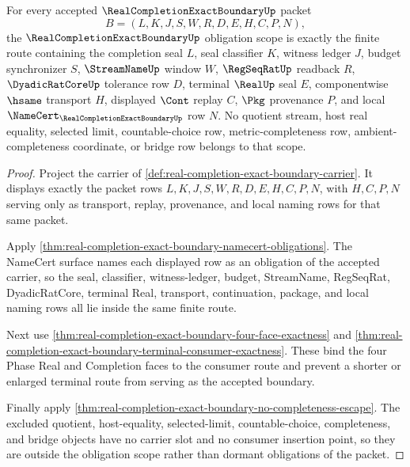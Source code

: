 \begin{theorem}
\label{thm:real-completion-exact-boundary-obligation-scope}
For every accepted $\RealCompletionExactBoundaryUp$ packet
$$
B=(L,K,J,S,W,R,D,E,H,C,P,N),
$$
the $\RealCompletionExactBoundaryUp$ obligation scope is exactly the finite route containing the completion seal $L$, seal classifier $K$, witness ledger $J$, budget synchronizer $S$, $\StreamNameUp$ window $W$, $\RegSeqRatUp$ readback $R$, $\DyadicRatCoreUp$ tolerance row $D$, terminal $\RealUp$ seal $E$, componentwise $\hsame$ transport $H$, displayed $\Cont$ replay $C$, $\Pkg$ provenance $P$, and local $\NameCert_{\RealCompletionExactBoundaryUp}$ row $N$. No quotient stream, host real equality, selected limit, countable-choice row, metric-completeness row, ambient-completeness coordinate, or bridge row belongs to that scope.
\end{theorem}
\begin{proof}
Project the carrier of \autoref{def:real-completion-exact-boundary-carrier}. It displays exactly the packet rows $L,K,J,S,W,R,D,E,H,C,P,N$, with $H,C,P,N$ serving only as transport, replay, provenance, and local naming rows for that same packet.

Apply \autoref{thm:real-completion-exact-boundary-namecert-obligations}. The NameCert surface names each displayed row as an obligation of the accepted carrier, so the seal, classifier, witness-ledger, budget, StreamName, RegSeqRat, DyadicRatCore, terminal Real, transport, continuation, package, and local naming rows all lie inside the same finite route.

Next use \autoref{thm:real-completion-exact-boundary-four-face-exactness} and \autoref{thm:real-completion-exact-boundary-terminal-consumer-exactness}. These bind the four Phase Real and Completion faces to the consumer route and prevent a shorter or enlarged terminal route from serving as the accepted boundary.

Finally apply \autoref{thm:real-completion-exact-boundary-no-completeness-escape}. The excluded quotient, host-equality, selected-limit, countable-choice, completeness, and bridge objects have no carrier slot and no consumer insertion point, so they are outside the obligation scope rather than dormant obligations of the packet.
\end{proof}

